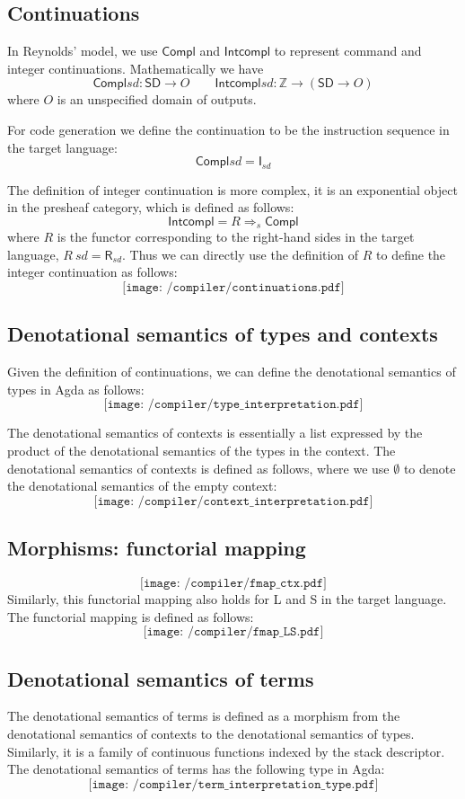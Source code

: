 \documentclass[12pt,a4paper]{report}
\theoremstyle{definition}
\newcommand{\bZ}{\mathbb{Z}}
\begin{document}
    \subsection{Continuations}
    In Reynolds' model, we use $\mathsf{Compl}$ and $\mathsf{Intcompl}$ to represent command and integer continuations. Mathematically we have
    \[\mathsf{Compl } sd : \mathsf{SD} \to O \qquad \mathsf{Intcompl } sd : \bZ \to (\mathsf{SD} \to O)\]
    where $O$ is an unspecified domain of outputs.

    For code generation we define the continuation to be the instruction sequence in the target language:
    \[\mathsf{Compl } sd = \textsf{I}_{sd}\]

    The definition of integer continuation is more complex, it is an exponential object in the presheaf category, which is defined as follows:
    \[\mathsf{Intcompl } = R \Rightarrow_s \mathsf{Compl } \]
    where $R$ is the functor corresponding to the right-hand sides in the target language, $R\ sd = \textsf{R}_{sd}$. Thus we can directly use the definition of $R$ to define the integer continuation as follows:
    \[\texttt{[image: /compiler/continuations.pdf]}\]

    \subsection{Denotational semantics of types and contexts}
    Given the definition of continuations, we can define the denotational semantics of types in Agda as follows:
    \[\texttt{[image: /compiler/type\_interpretation.pdf]}\]

    The denotational semantics of contexts is essentially a list expressed by the product of the denotational semantics of the types in the context. The denotational semantics of contexts is defined as follows, where we use $\emptyset$ to denote the denotational semantics of the empty context:
    \[\texttt{[image: /compiler/context\_interpretation.pdf]}\]

    \subsection{Morphisms: functorial mapping}
    \[\texttt{[image: /compiler/fmap\_ctx.pdf]}\]
    Similarly, this functorial mapping also holds for \textsf{L} and \textsf{S} in the target language. The functorial mapping is defined as follows:
    \[\texttt{[image: /compiler/fmap\_LS.pdf]}\]

    \subsection{Denotational semantics of terms}
    The denotational semantics of terms is defined as a morphism from the denotational semantics of contexts to the denotational semantics of types. Similarly, it is a family of continuous functions indexed by the stack descriptor. The denotational semantics of terms has the following type in Agda:
    \[\texttt{[image: /compiler/term\_interpretation\_type.pdf]}\]
\end{document}
